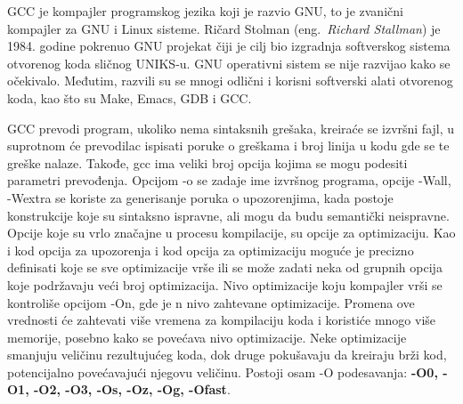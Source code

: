 \documentclass[a4paper]{article}
\begin{document}
GCC je kompajler programskog jezika koji je razvio GNU, to je zvanični kompajler za GNU i Linux sisteme. Ričard Stolman (eng.~{\em Richard Stallman}) je 1984. godine pokrenuo GNU projekat čiji je cilj bio izgra\-dnja softverskog sistema otvorenog koda sličnog UNIKS-u. GNU operativni sistem se nije razvijao kako se očekivalo. Međutim, razvili su se mnogi odlični i korisni softverski alati otvorenog koda, kao što su Make, Emacs, GDB i GCC. \cite{gccVsClang}

GCC prevodi program, ukoliko nema sintaksnih grešaka, kreiraće se izvršni fajl, u suprotnom će prevodilac ispisati poruke o greškama i broj linija u kodu gde se te greške nalaze. Takođe, gcc ima veliki broj opcija kojima se mogu podesiti parametri prevođenja. Opcijom -o se zadaje ime izvršnog programa, opcije -Wall, -Wextra se koriste za generisanje poruka o upozorenjima, kada postoje konstrukcije koje su sintaksno ispravne, ali mogu da budu semantički neispravne. Opcije koje su vrlo značajne u procesu kompilacije, su opcije za optimizaciju. Kao i kod opcija za upozorenja i kod opcija za optimizaciju moguće je precizno definisati koje se sve optimizacije vrše ili se može zadati neka od grupnih opcija koje podržavaju veći broj optimizacija. Nivo optimizacije koju kompajler vrši se kontroliše opcijom -On, gde je n nivo zahtevane optimizacije. Promena ove vrednosti će zahtevati više vremena za kompilaciju koda i koristiće mnogo više memorije, posebno kako se povećava nivo optimizacije. \cite{gnuSamardzic} Neke optimizacije smanjuju veličinu rezultujućeg koda, dok druge pokušavaju da kreiraju brži kod, potencijalno povećavajući njegovu veličinu. Postoji osam -O podesavanja: \textbf{-O0, -O1, -O2, -O3, -Os, -Oz, -Og, -Ofast}.
\end{document}
